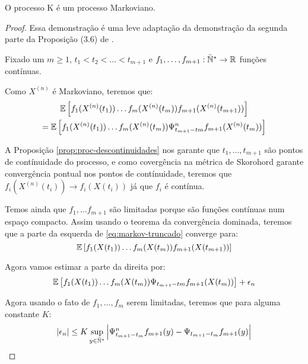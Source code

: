 \begin{teorema}
  \label{teo:proc_markov}
  O processo K é um processo Markoviano.
\end{teorema}

\begin{proof}

  Essa demonstração é uma leve adaptação da demonstração da segunda
  parte da Proposição (3.6) de \cite{fontes:08}.

  Fixado um $m \geq 1$, $t_1 < t_2 < \ldots < t_{m+1}$ e $f_1, \ldots,
  f_{m+1} : {\mathbb{\bar{N}^*}} \to {\mathbb{R}}$ funções contínuas.

  Como $X^{(n)}$ é Markoviano, teremos que:
  \begin{gather}
    \label{eq:markov-truncado}
    {\mathbb{E}} \left[
      f_{1}(X^{(n)}(t_{1})) 
      \ldots
      f_{m}(X^{(n)}(t_{m})) 
      f_{m+1}(X^{(n)}(t_{m+1})) 
    \right] \notag\\
    = {\mathbb{E}} \left[
      f_{1}(X^{(n)}(t_{1})) 
      \ldots
      f_{m}(X^{(n)}(t_{m})) 
      \Psi^n_{t_{m+1} - t{m}} f_{m+1} (X^{(n)}(t_{m})) 
    \right]
  \end{gather}

  A Proposição \ref{prop:proc-descontinuidades} nos garante que \qc
  $t_1, \ldots, t_{m+1}$ são pontos de contínuidade do processo, e
  como covergência na métrica de Skorohord garante convergência
  pontual nos pontos de contínuidade, teremos que $f_i(X^{(n)}(t_i)) \to
  f_i(X(t_i))$ \qc já que $f_i$ é contínua.

  Temos ainda que $f_1, \ldots f_{m+1}$ são limitadas porque são
  funções contínuas num espaço compacto. Assim usando o teorema da
  convergência dominada, teremos que a parte da esquerda de
  \eqref{eq:markov-truncado} converge para:
  \begin{displaymath}
    {\mathbb{E}} \left[
      f_{1}(X(t_{1})) 
      \ldots
      f_{m}(X(t_{m})) 
      f_{m+1}(X(t_{m+1})) 
    \right]
  \end{displaymath}

  Agora vamos estimar a parte da direita por:
  \begin{displaymath}
    {\mathbb{E}} \left[
      f_{1}(X (t_{1})) 
      \ldots
      f_{m}(X (t_{m})) 
      \Psi_{t_{m+1} - t{m}} f_{m+1} (X (t_{m})) 
    \right] + \epsilon_n
  \end{displaymath}

  Agora usando o fato de $f_1, \ldots, f_m$ serem limitadas, teremos
  que para alguma constante $K$:
  \begin{displaymath}
    |\epsilon_n| \leq  K \sup_{y \in {\mathbb{\bar{N}^*}}} \left\lvert
      \Psi^n_{t_{m+1}-t_m} f_{m+1} (y) - 
      \Psi_{t_{m+1}-t_m} f_{m+1} (y) 
    \right\rvert
  \end{displaymath}


\end{proof}
